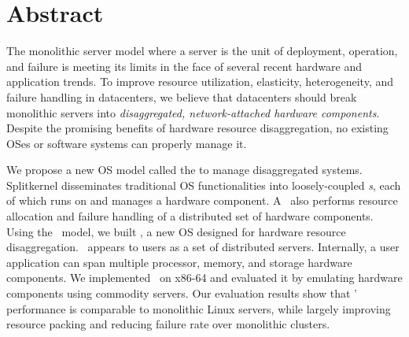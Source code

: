 \section*{Abstract}

The monolithic server model where a server is the unit of deployment, operation, and failure 
is meeting its limits in the face of several recent hardware and application trends. 
To improve resource utilization, elasticity, heterogeneity, and failure handling in datacenters, 
we believe that datacenters should break monolithic servers into {\em disaggregated, network-attached hardware components}. 
Despite the promising benefits of hardware resource disaggregation, 
no existing OSes or software systems can properly manage it.

We propose a new OS model called the {\em \splitkernel} to manage disaggregated systems. 
Splitkernel disseminates traditional OS functionalities into loosely-coupled {\em \microos{}s},
each of which runs on and manages a hardware component.
A \splitkernel\ also performs resource allocation and failure handling of a distributed set of hardware components.
Using the \splitkernel\ model, we built {\em \lego}, 
a new OS designed for hardware resource disaggregation. 
\lego\ appears to users as a set of distributed servers.
Internally, a user application can span multiple processor, memory, and storage hardware components.
We implemented \lego\ on x86-64 and evaluated it by emulating hardware components using commodity servers. 
Our evaluation results show that \lego' performance is comparable to monolithic Linux servers,
while largely improving resource packing and reducing failure rate over monolithic clusters.


